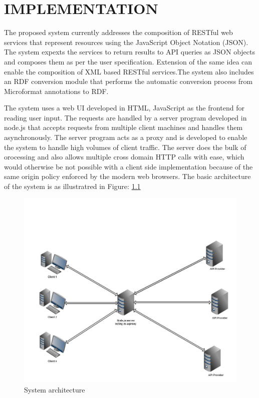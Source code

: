 \chapter{IMPLEMENTATION}
\begin{spacing}{1.5}
The proposed system currently addresses the composition of RESTful web services that represent resources using the JavaScript Object Notation (JSON). The system expexts the services to return results to API queries as JSON objects and composes them as per the user specification. Extension of the same idea can enable the composition of XML based RESTful services.The system also includes an RDF conversion module that performs the automatic conversion process from Microformat annotations to RDF.

The system uses a web UI developed in HTML, JavaScript as the frontend for reading user input. The requests are handled by a server program developed in node.js that accepts requests from multiple client machines and handles them asynchronously. The server program acts as a proxy and is developed to enable the system to handle high volumes of client traffic. The server does the bulk of orocessing and also allows multiple cross domain HTTP calls with ease, which would otherwise be not possible with a client side implementation because of the same origin policy enforced by the modern web browsers. The basic architecture of the system is as illustratred in Figure: \ref{fig:architecture}

\begin{figure}
        \centering
        \includegraphics[scale=0.3]{images/Architecture.jpg}
        \caption{System architecture }
        \label{fig:architecture}
\end{figure}


\end{spacing}
